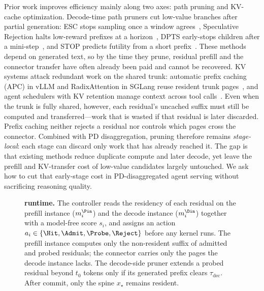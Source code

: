 Prior work improves efficiency mainly along two axes: path pruning and KV-cache optimization.
Decode-time path pruners cut low-value branches after partial generation: ESC stops sampling once a window agrees~\cite{esc}, Speculative Rejection halts low-reward prefixes at a horizon~\cite{specrej}, DPTS early-stops children after a mini-step~\cite{dpts}, and STOP predicts futility from a short prefix~\cite{stoploss}.
These methods depend on generated text, so by the time they prune, residual prefill and the connector transfer have often already been paid and cannot be recovered.
KV systems attack redundant work on the shared trunk: automatic prefix caching (APC) in vLLM and RadixAttention in SGLang reuse resident trunk pages~\cite{vllm,sglang}, and agent schedulers with KV retention manage context across tool calls~\cite{autellix,continuum,mori,conserve,forkkv}.
Even when the trunk is fully shared, however, each residual's uncached suffix must still be computed and transferred---work that is wasted if that residual is later discarded.
Prefix caching neither rejects a residual nor controls which pages cross the connector.
Combined with PD disaggregation, pruning therefore remains \emph{stage-local}: each stage can discard only work that has already reached it.
The gap is that existing methods reduce duplicate compute and later decode, yet leave the prefill and KV-transfer cost of low-value candidates largely untouched.
We ask how to cut that early-stage cost in PD-disaggregated agent serving without sacrificing reasoning quality.

\begin{figure}[t]
\centering
\resizebox{0.78\textwidth}{!}{}
\caption{\textbf{\sys{} runtime.}
The controller reads the residency of each residual on the prefill instance ($m_i^{\Pin}$) and the decode instance ($m_i^{\Din}$) together with a model-free score $s_i$, and assigns an action $a_i\in\{\Hit,\Admit,\Probe,\Reject\}$ before any kernel runs.
The prefill instance computes only the non-resident suffix of admitted and probed residuals; the connector carries only the pages the decode instance lacks.
The decode-side pruner extends a probed residual beyond $t_0$ tokens only if its generated prefix clears $\tau_{\mathrm{dec}}$.
After commit, only the spine $x_\star$ remains resident.}
\label{fig:system}
\end{figure}

